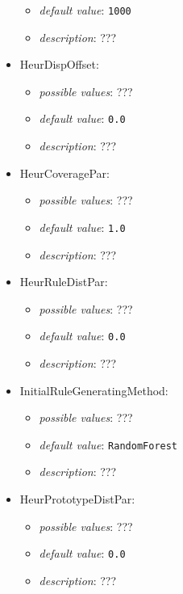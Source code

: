 \documentclass{article}
\begin{document}
\begin{itemize}
\begin{itemize}
                \item \emph{default value}: \texttt{1000}
                \item \emph{description}: ???
           \end{itemize}
    \item HeurDispOffset:
           \begin{itemize}
                \item \emph{possible values}: ???
                \item \emph{default value}: \texttt{0.0}
                \item \emph{description}: ???
           \end{itemize}
    \item HeurCoveragePar:
           \begin{itemize}
                \item \emph{possible values}: ???
                \item \emph{default value}: \texttt{1.0}
                \item \emph{description}: ???
           \end{itemize}
    \item HeurRuleDistPar:
           \begin{itemize}
                \item \emph{possible values}: ???
                \item \emph{default value}: \texttt{0.0}
                \item \emph{description}: ???
           \end{itemize}
    \item InitialRuleGeneratingMethod:
           \begin{itemize}
                \item \emph{possible values}: ???
                \item \emph{default value}: \texttt{RandomForest}
                \item \emph{description}: ???
           \end{itemize}
    \item HeurPrototypeDistPar:
           \begin{itemize}
                \item \emph{possible values}: ???
                \item \emph{default value}: \texttt{0.0}
                \item \emph{description}: ???
           \end{itemize}

\end{itemize}
\end{document}

